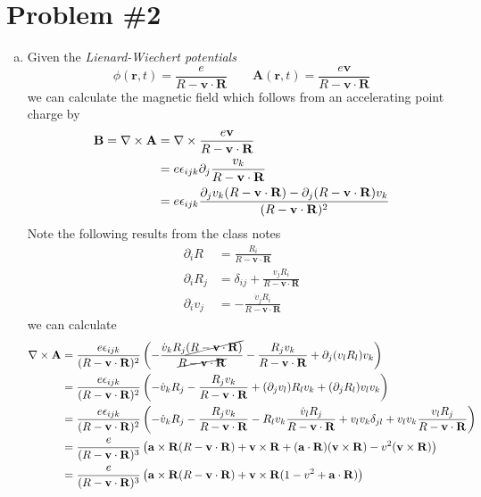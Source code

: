 \documentclass[11pt]{article}
\numberwithin{equation}{section}
\begin{document}
\pagebreak

\section{Problem \#2}
\begin{enumerate}[(a)]
\item
    Given the \emph{Lienard-Wiechert potentials}
    \begin{equation}
        \phi(\mathbf{r},t) = \frac{e}{R-\mathbf{v}\cdot\mathbf{R}} \qquad \mathbf{A}(\mathbf{r},t) = \frac{e\mathbf{v}}{R-\mathbf{v}\cdot\mathbf{R}}
    \end{equation}
    we can calculate the magnetic field which follows from an accelerating point charge by\
    \begin{align*}
        \mathbf{B} = \bold\nabla\times\mathbf{A} &= \bold\nabla\times\frac{e\mathbf{v}}{R-\mathbf{v}\cdot\mathbf{R}}\\
                              &= e\epsilon_{ijk}\partial_{j}\frac{v_k}{R-\mathbf{v}\cdot\mathbf{R}}\\
                              &= e\epsilon_{ijk}\frac{\partial_jv_k(R-\mathbf{v}\cdot\mathbf{R})-\partial_j(R-\mathbf{v}\cdot\mathbf{R})v_k}{(R-\mathbf{v}\cdot\mathbf{R})^2}
    \end{align*}
    Note the following results from the class notes
    \begin{align*}
        \partial_iR &= \frac{R_i}{R-\mathbf{v}\cdot\mathbf{R}}\\
        \partial_iR_j &= \delta_{ij} + \frac{v_jR_i}{R-\mathbf{v}\cdot\mathbf{R}}\\
        \partial_iv_j &= -\frac{\dot{v}_jR_i}{R-\mathbf{v}\cdot\mathbf{R}}
    \end{align*}
    we can calculate
    \begin{align*}
        \bold\nabla\times\mathbf{A} &= \frac{e\epsilon_{ijk}}{(R-\mathbf{v}\cdot\mathbf{R})^2}\left(-\frac{\dot{v}_kR_j\cancel{(R-\mathbf{v}\cdot\mathbf{R})}}{\cancel{R-\mathbf{v}\cdot\mathbf{R}}} - \frac{R_jv_k}{R-\mathbf{v}\cdot\mathbf{R}} + \partial_{j}(v_lR_l)v_k\right)\\
                              &= \frac{e\epsilon_{ijk}}{(R-\mathbf{v}\cdot\mathbf{R})^2}\left(-\dot{v}_kR_j - \frac{R_jv_k}{R-\mathbf{v}\cdot\mathbf{R}} + (\partial_{j}v_l)R_lv_k + (\partial_{j}R_l)v_lv_k\right)\\
                              &= \frac{e\epsilon_{ijk}}{(R-\mathbf{v}\cdot\mathbf{R})^2}\left(-\dot{v}_kR_j - \frac{R_jv_k}{R-\mathbf{v}\cdot\mathbf{R}} - R_lv_k\frac{\dot{v}_lR_j}{R-\mathbf{v}\cdot\mathbf{R}} + v_lv_k\delta_{jl} + v_lv_k\frac{v_lR_j}{R-\mathbf{v}\cdot\mathbf{R}}\right)\\
                              &= \frac{e}{(R-\mathbf{v}\cdot\mathbf{R})^3}\left(\mathbf{a}\times\mathbf{R}(R-\mathbf{v}\cdot\mathbf{R}) + \mathbf{v}\times\mathbf{R} + (\mathbf{a}\cdot\mathbf{R})(\mathbf{v}\times\mathbf{R})  - v^2(\mathbf{v}\times\mathbf{R})\right)\\
        &= \frac{e}{(R-\mathbf{v}\cdot\mathbf{R})^3}\left(\mathbf{a}\times\mathbf{R}(R-\mathbf{v}\cdot\mathbf{R}) + \mathbf{v}\times\mathbf{R}(1-v^2+\mathbf{a}\cdot\mathbf{R})\right)
    \end{align*}


\end{enumerate}
\end{document}
